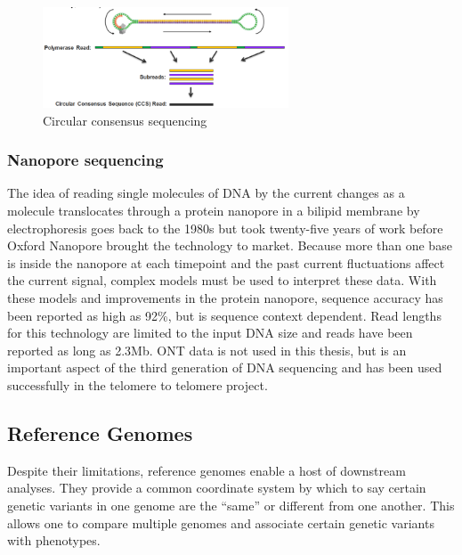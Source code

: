 \begin{figure}[htbp!]
\caption{Circular consensus sequencing}
\label{figure:ccs}
\begin{centering}
\includegraphics[width=0.65\textwidth]{CCS.png}
\end{centering}

\end{figure}

\subsubsection{Nanopore sequencing}

\par{
The idea of reading single molecules of DNA by the current changes as a molecule translocates through a protein nanopore in a bilipid membrane by electrophoresis goes back to the 1980s\cite{nanopore1} but took twenty-five years of work before Oxford Nanopore brought the technology to market\cite{nanopore2}\cite{nanopore3}. Because more than one base is inside the nanopore at each timepoint and the past current fluctuations affect the current signal, complex models must be used to interpret these data\cite{nanocall}\cite{deepnano}. With these models and improvements in the protein nanopore, sequence accuracy has been reported as high as 92\%, but is sequence context dependent. Read lengths for this technology are limited to the input DNA size and reads have been reported as long as 2.3Mb\cite{longlong}\cite{ultralong2}. ONT data is not used in this thesis, but is an important aspect of the third generation of DNA sequencing and has been used successfully in the telomere to telomere project\cite{T2T2}.
}

\subsection{Reference Genomes}

\par{
Despite their limitations, reference genomes enable a host of downstream analyses. They provide a common coordinate system by which to say certain genetic variants in one genome are the ``same'' or different from one another\cite{GRCh38}. This allows one to compare multiple genomes and associate certain genetic variants with phenotypes.
}

